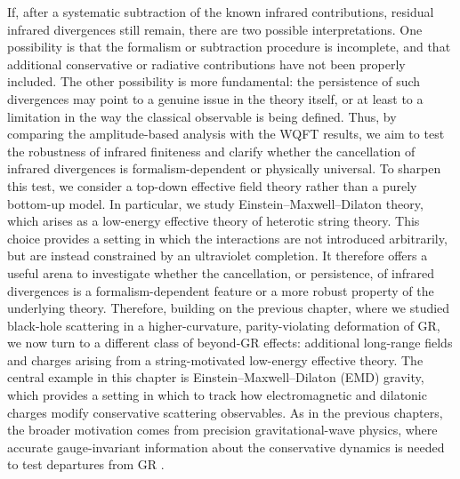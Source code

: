 {If, after a systematic subtraction of the known infrared contributions, residual infrared divergences still remain, there are two possible interpretations. One possibility is that the formalism or subtraction procedure is incomplete, and that additional conservative or radiative contributions have not been properly included. The other possibility is more fundamental: the persistence of such divergences may point to a genuine issue in the theory itself, or at least to a limitation in the way the classical observable is being defined. Thus, by comparing the amplitude-based analysis with the WQFT results, we aim to test the robustness of infrared finiteness and clarify whether the cancellation of infrared divergences is formalism-dependent or physically universal.  To sharpen this test, we consider a top-down effective field theory rather than a purely bottom-up model. In particular, we study Einstein--Maxwell--Dilaton theory, which arises as a low-energy effective theory of heterotic string theory. This choice provides a setting in which the interactions are not introduced arbitrarily, but are instead constrained by an ultraviolet completion. It therefore offers a useful arena to investigate whether the cancellation, or persistence, of infrared divergences is a formalism-dependent feature or a more robust property of the underlying theory.
} Therefore, building on the previous chapter, where we studied black-hole scattering in a higher-curvature, parity-violating deformation of GR, we now turn to a different class of beyond-GR effects: additional long-range fields and charges arising from a string-motivated low-energy effective theory. The central example in this chapter is Einstein--Maxwell--Dilaton (EMD) gravity, which provides a  setting in which to track how electromagnetic and dilatonic charges modify conservative scattering observables. As in the previous chapters, the broader motivation comes from precision gravitational-wave physics, where accurate gauge-invariant information about the conservative dynamics is needed to test departures from GR \cite{LIGOScientific:2016aoc,LIGOScientific:2016sjg,LIGOScientific:2016vlm,LIGOScientific:2017bnn,LIGOScientific:2019hgc,Purrer:2019jcp}.

